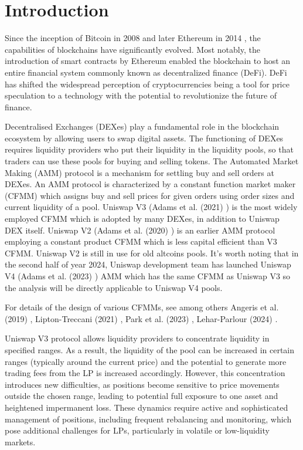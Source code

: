\documentclass{article}
\begin{document}
\newpage  %

\tableofcontents
\newpage



\section{Introduction}
Since the inception of Bitcoin in 2008 \cite{bitcoin} and later Ethereum in 2014 \cite{ethereum}, the capabilities of blockchains have significantly evolved. Most notably, the introduction of smart contracts by Ethereum enabled the blockchain to host an entire financial system commonly known as decentralized finance (DeFi). DeFi has shifted the widespread perception of cryptocurrencies being a tool for price speculation to a technology with the potential to revolutionize the future of finance.

Decentralised Exchanges (DEXes) play a fundamental role in the blockchain ecosystem by allowing users
to swap digital assets. 
The functioning of DEXes requires liquidity providers who put their
liquidity in the liquidity pools, so that traders can use these pools for buying and selling tokens.
The Automated Market Making (AMM) protocol is a mechanism for settling buy and sell orders at
DEXes. An AMM protocol is characterized by a constant function market maker (CFMM) which
assigns buy and sell prices for given orders using order sizes and current liquidity of a pool. Uniswap
V3 (Adams et al. (2021) \cite{univ3}) is the most widely employed CFMM which is adopted by many DEXes,
in addition to Uniswap DEX itself. Uniswap V2 (Adams et al. (2020) \cite{univ2}) is an earlier AMM protocol
employing a constant product CFMM which is less capital efficient than V3 CFMM. Uniswap V2
is still in use for old altcoins pools. It's worth noting that in the second half of year 2024, Uniswap development team has launched Uniswap V4 (Adams et al. (2023)  \cite{univ4}) AMM which
has the same CFMM as Uniswap V3 so the analysis will be directly applicable to Uniswap V4 pools.

For details of the design of various CFMMs, see among others Angeris et al. (2019) \cite{angeris2019}, Lipton-Treccani (2021) \cite{liptontreccani2021}, Park et al. (2023) \cite{park2023}, Lehar-Parlour (2024) \cite{lehar2024}.

Uniswap V3 protocol allows liquidity providers to concentrate liquidity in specified ranges. As
a result, the liquidity of the pool can be increased in certain ranges (typically around the current
price) and the potential to generate more trading fees from the LP is increased accordingly.
However, this concentration introduces new difficulties, as positions become sensitive to price movements outside the chosen range, leading to potential full exposure to one asset and heightened impermanent loss. These dynamics require active and sophisticated management of positions, including frequent rebalancing and monitoring, which pose additional challenges for LPs, particularly in volatile or low-liquidity markets.
\end{document}
